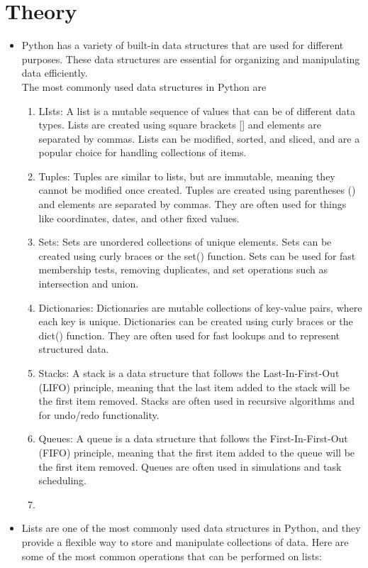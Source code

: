\documentclass{article}
\begin{document}
	\section{\textbf{Theory}}
	\begin{itemize}
		\item  Python has a variety of built-in data structures that are used for different purposes. These data structures are essential for organizing and manipulating data efficiently.\\
		The most commonly used data structures in Python are
			\begin{enumerate}
				\item LIsts: A list is a mutable sequence of values that can be of different data types. Lists are created using square brackets [] and elements are separated by commas. Lists can be modified, sorted, and sliced, and are a popular choice for handling collections of items.
				\item  Tuples: Tuples are similar to lists, but are immutable, meaning they cannot be modified once created. Tuples are created using parentheses () and elements are separated by commas. They are often used for things like coordinates, dates, and other fixed values.
				\item Sets: Sets are unordered collections of unique elements. Sets can be created using curly braces {} or the set() function. Sets can be used for fast membership tests, removing duplicates, and set operations such as intersection and union.
				\item Dictionaries: Dictionaries are mutable collections of key-value pairs, where each key is unique. Dictionaries can be created using curly braces {} or the dict() function. They are often used for fast lookups and to represent structured data.
				\item Stacks: A stack is a data structure that follows the Last-In-First-Out (LIFO) principle, meaning that the last item added to the stack will be the first item removed. Stacks are often used in recursive algorithms and for undo/redo functionality.
				\item Queues: A queue is a data structure that follows the First-In-First-Out (FIFO) principle, meaning that the first item added to the queue will be the first item removed. Queues are often used in simulations and task scheduling.
				\item 
			\end{enumerate}
		\item Lists are one of the most commonly used data structures in Python, and they provide a flexible way to store and manipulate collections of data. Here are some of the most common operations that can be performed on lists:

\end{itemize}
\end{document}
